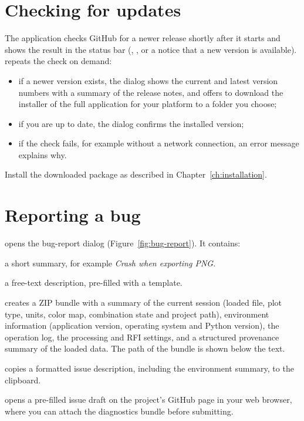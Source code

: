 
\section{Checking for updates}
\label{sec:updates}

The application checks GitHub for a newer release shortly after it starts and shows the
result in the status bar (, , or a
notice that a new version is available).  repeats the
check on demand:
\begin{itemize}
  \item if a newer version exists, the dialog shows the current and latest version numbers
    with a summary of the release notes, and offers to download the installer of the full
    application for your platform to a folder you choose;
  \item if you are up to date, the dialog confirms the installed version;
  \item if the check fails, for example without a network connection, an error message
    explains why.
\end{itemize}
Install the downloaded package as described in Chapter~\ref{ch:installation}.

\section{Reporting a bug}
\label{sec:bug-report}

 opens the bug-report dialog
(Figure~\ref{fig:bug-report}). It contains:
\begin{description}[style=nextline]
  \item[Bug Title] a short summary, for example \emph{Crash when exporting PNG}.
  \item[What happened / Steps to reproduce / Expected behavior] a free-text description,
    pre-filled with a template.
  \item[Generate Diagnostics...] creates a ZIP bundle with a summary of the current session
    (loaded file, plot type, units, color map, combination state and project path),
    environment information (application version, operating system and Python version),
    the operation log, the processing and RFI settings, and a structured provenance
    summary of the loaded data. The path of the bundle is
    shown below the text.
  \item[Copy Issue Text] copies a formatted issue description, including the environment
    summary, to the clipboard.
  \item[Open GitHub Issue] opens a pre-filled issue draft on the project's GitHub page in
    your web browser, where you can attach the diagnostics bundle before submitting.
\end{description}

